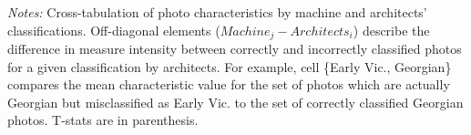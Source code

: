 \documentclass[]{article}
\begin{document}
\begin{table}[!htb]
\begin{tabular}{lrrrrrrr}
\end{tabular} 
 \begin{minipage}{\textwidth} 
\footnotesize 
\vspace{0.25cm}
\emph{Notes:} Cross-tabulation of photo characteristics by machine and architects' classifications. Off-diagonal elements ($Machine_{j}-Architects_{i}$) describe the difference in measure intensity between correctly and incorrectly classified photos for a given classification by architects. For example, cell \{Early Vic., Georgian\} compares the mean characteristic value for the set of photos which are actually Georgian but misclassified as Early Vic. to the set of correctly classified Georgian photos. T-stats are in parenthesis.
\end{minipage} 
\endgroup 
\end{table}

\newpage
\clearpage
\end{document}
